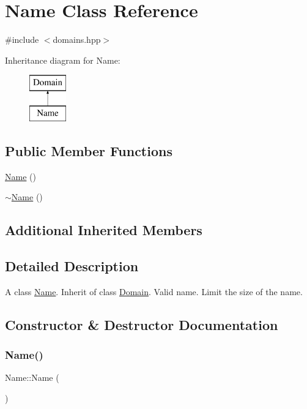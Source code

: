 \hypertarget{class_name}{}\section{Name Class Reference}
\label{class_name}


{\ttfamily \#include $<$domains.\+hpp$>$}

Inheritance diagram for Name\+:\begin{figure}[H]
\begin{center}
\leavevmode
\includegraphics[height=2.000000cm]{class_name}
\end{center}
\end{figure}
\subsection*{Public Member Functions}
\begin{DoxyCompactItemize}
\item 
\hyperlink{class_name_a12a92d46d52b216ccaa86e3cb1539e58}{Name} ()
\item 
\hyperlink{class_name_ada9b23969d47506787d185c3fda43d77}{$\sim$\+Name} ()
\end{DoxyCompactItemize}
\subsection*{Additional Inherited Members}


\subsection{Detailed Description}
A class \hyperlink{class_name}{Name}. Inherit of class \hyperlink{class_domain}{Domain}. Valid name. Limit the size of the name. 

\subsection{Constructor \& Destructor Documentation}
\mbox{\label{class_name_a12a92d46d52b216ccaa86e3cb1539e58}} 
\subsubsection{\texorpdfstring{Name()}{Name()}}
{\footnotesize\ttfamily Name\+::\+Name (\begin{DoxyParamCaption}{ }\end{DoxyParamCaption})}

